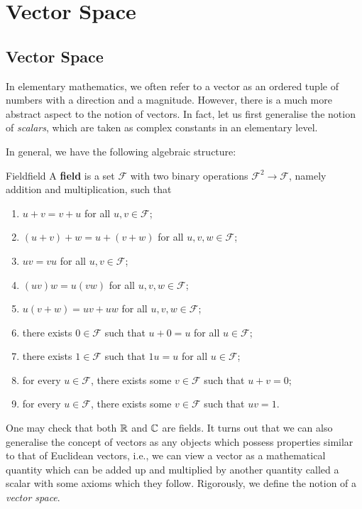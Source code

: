 \documentclass[math, code]{amznotes}
\theoremstyle{remark}
\begin{document}
\tableofcontents

\chapter{Vector Space}
\section{Vector Space}
In elementary mathematics, we often refer to a vector as an ordered tuple of numbers with a direction and a magnitude. However, there is a much more abstract aspect to the notion of vectors. In fact, let us first generalise the notion of \textit{scalars}, which are taken as complex constants in an elementary level. 

In general, we have the following algebraic structure:
\begin{dfnbox}{Field}{field}
    A {\color{red} \textbf{field}} is a set $\mathcal{F}$ with two binary operations $\mathcal{F}^2 \to \mathcal{F}$, namely addition and multiplication, such that
    \begin{enumerate}
        \item $u + v = v + u$ for all $u, v \in \mathcal{F}$;
        \item $(u + v) + w = u + (v + w)$ for all $u, v, w \in \mathcal{F}$;
        \item $uv = vu$ for all $u, v \in \mathcal{F}$;
        \item $(uv)w = u(vw)$ for all $u, v, w \in \mathcal{F}$;
        \item $u(v + w) = uv + uw$ for all $u, v, w \in \mathcal{F}$;
        \item there exists $0 \in \mathcal{F}$ such that $u + 0 = u$ for all $u \in \mathcal{F}$;
        \item there exists $1 \in \mathcal{F}$ such that $1u = u$ for all $u \in \mathcal{F}$;
        \item for every $u \in \mathcal{F}$, there exists some $v \in \mathcal{F}$ such that $u + v = 0$;
        \item for every $u \in \mathcal{F}$, there exists some $v \in \mathcal{F}$ such that $uv = 1$.
    \end{enumerate}
\end{dfnbox}
One may check that both $\mathbb{R}$ and $\mathbb{C}$ are fields. It turns out that we can also generalise the concept of vectors as any objects which possess properties similar to that of Euclidean vectors, i.e., we can view a vector as a mathematical quantity which can be added up and multiplied by another quantity called a scalar with some axioms which they follow. Rigorously, we define the notion of a \textit{vector space}.
\end{document}
